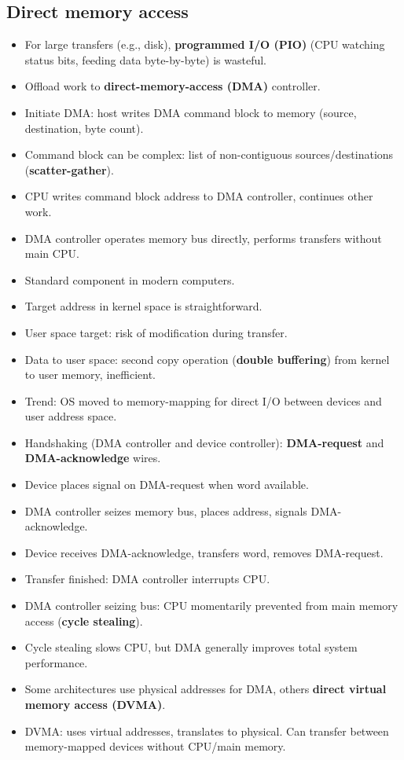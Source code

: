 \subsection{Direct memory access}
\begin{itemize}
    \item For large transfers (e.g., disk), \textbf{programmed I/O (PIO)} (CPU watching status bits, feeding data byte-by-byte) is wasteful.
    \item Offload work to \textbf{direct-memory-access (DMA)} controller.
    \item Initiate DMA: host writes DMA command block to memory (source, destination, byte count).
    \item Command block can be complex: list of non-contiguous sources/destinations (\textbf{scatter-gather}).
    \item CPU writes command block address to DMA controller, continues other work.
    \item DMA controller operates memory bus directly, performs transfers without main CPU.
    \item Standard component in modern computers.
    \item Target address in kernel space is straightforward.
    \item User space target: risk of modification during transfer.
    \item Data to user space: second copy operation (\textbf{double buffering}) from kernel to user memory, inefficient.
    \item Trend: OS moved to memory-mapping for direct I/O between devices and user address space.
    \item Handshaking (DMA controller and device controller): \textbf{DMA-request} and \textbf{DMA-acknowledge} wires.
    \item Device places signal on DMA-request when word available.
    \item DMA controller seizes memory bus, places address, signals DMA-acknowledge.
    \item Device receives DMA-acknowledge, transfers word, removes DMA-request.
    \item Transfer finished: DMA controller interrupts CPU.
    \item DMA controller seizing bus: CPU momentarily prevented from main memory access (\textbf{cycle stealing}).
    \item Cycle stealing slows CPU, but DMA generally improves total system performance.
    \item Some architectures use physical addresses for DMA, others \textbf{direct virtual memory access (DVMA)}.
    \item DVMA: uses virtual addresses, translates to physical. Can transfer between memory-mapped devices without CPU/main memory.
\end{itemize}

